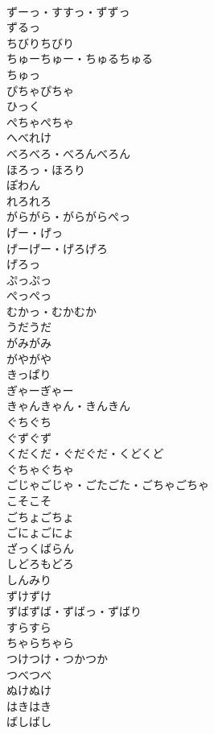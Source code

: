 \documentclass[8pt]{extreport}
\begin{document}
\begin{CJK}{UTF8}{min}
\\	ずーっ・すすっ・ずずっ	
\\	ずるっ	
\\	ちびりちびり	
\\	ちゅーちゅー・ちゅるちゅる	
\\	ちゅっ	
\\	ぴちゃぴちゃ	
\\	ひっく	
\\	ぺちゃぺちゃ	
\\	へべれけ	
\\	べろべろ・べろんべろん	
\\	ほろっ・ほろり	
\\	ぽわん	
\\	れろれろ	
\\	がらがら・がらがらぺっ	
\\	げー・げっ	
\\	げーげー・げろげろ	
\\	げろっ	
\\	ぷっぷっ	
\\	ぺっぺっ	
\\	むかっ・むかむか	
\\	うだうだ	
\\	がみがみ	
\\	がやがや	
\\	きっぱり	
\\	ぎゃーぎゃー	
\\	きゃんきゃん・きんきん	
\\	ぐちぐち	
\\	ぐずぐず	
\\	くだくだ・ぐだぐだ・くどくど	
\\	ぐちゃぐちゃ	
\\	ごじゃごじゃ・ごたごた・ごちゃごちゃ	
\\	こそこそ	
\\	ごちょごちょ	
\\	ごにょごにょ	
\\	ざっくばらん	
\\	しどろもどろ	
\\	しんみり	
\\	ずけずけ	
\\	ずばずば・ずばっ・ずばり	
\\	すらすら	
\\	ちゃらちゃら	
\\	つけつけ・つかつか	
\\	つべつべ	
\\	ぬけぬけ	
\\	はきはき	
\\	ばしばし	

\end{CJK}
\end{document}
